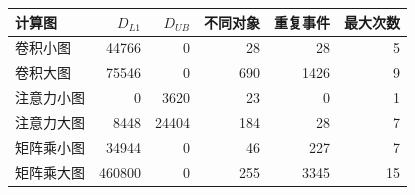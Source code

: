 \begin{tabular}{lrrrrr}\toprule
计算图 & $D_{L1}$ & $D_{UB}$ & 不同对象 & 重复事件 & 最大次数\\\midrule
卷积小图 & 44766 & 0 & 28 & 28 & 5\\
卷积大图 & 75546 & 0 & 690 & 1426 & 9\\
注意力小图 & 0 & 3620 & 23 & 0 & 1\\
注意力大图 & 8448 & 24404 & 184 & 28 & 7\\
矩阵乘小图 & 34944 & 0 & 46 & 227 & 7\\
矩阵乘大图 & 460800 & 0 & 255 & 3345 & 15\\
\bottomrule\end{tabular}
